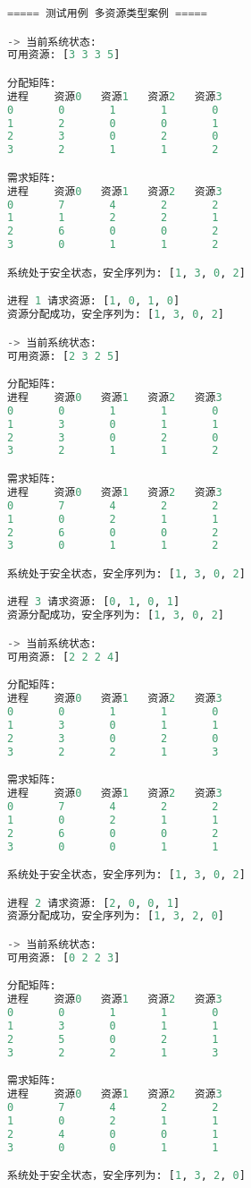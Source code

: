 \documentclass[12pt, a4paper, oneside]{ctexart}
\begin{document}
\begin{lstlisting}[language=Python, caption=测试用例三运行结果]
===== 测试用例 多资源类型案例 =====

-> 当前系统状态:
可用资源: [3 3 3 5]

分配矩阵:
进程    资源0   资源1   资源2   资源3
0       0       1       1       0
1       2       0       0       1
2       3       0       2       0
3       2       1       1       2

需求矩阵:
进程    资源0   资源1   资源2   资源3
0       7       4       2       2
1       1       2       2       1
2       6       0       0       2
3       0       1       1       2

系统处于安全状态，安全序列为: [1, 3, 0, 2]

进程 1 请求资源: [1, 0, 1, 0]
资源分配成功，安全序列为: [1, 3, 0, 2]

-> 当前系统状态:
可用资源: [2 3 2 5]

分配矩阵:
进程    资源0   资源1   资源2   资源3
0       0       1       1       0
1       3       0       1       1
2       3       0       2       0
3       2       1       1       2

需求矩阵:
进程    资源0   资源1   资源2   资源3
0       7       4       2       2
1       0       2       1       1
2       6       0       0       2
3       0       1       1       2

系统处于安全状态，安全序列为: [1, 3, 0, 2]

进程 3 请求资源: [0, 1, 0, 1]
资源分配成功，安全序列为: [1, 3, 0, 2]

-> 当前系统状态:
可用资源: [2 2 2 4]

分配矩阵:
进程    资源0   资源1   资源2   资源3
0       0       1       1       0
1       3       0       1       1
2       3       0       2       0
3       2       2       1       3

需求矩阵:
进程    资源0   资源1   资源2   资源3
0       7       4       2       2
1       0       2       1       1
2       6       0       0       2
3       0       0       1       1

系统处于安全状态，安全序列为: [1, 3, 0, 2]

进程 2 请求资源: [2, 0, 0, 1]
资源分配成功，安全序列为: [1, 3, 2, 0]

-> 当前系统状态:
可用资源: [0 2 2 3]

分配矩阵:
进程    资源0   资源1   资源2   资源3
0       0       1       1       0
1       3       0       1       1
2       5       0       2       1
3       2       2       1       3

需求矩阵:
进程    资源0   资源1   资源2   资源3
0       7       4       2       2
1       0       2       1       1
2       4       0       0       1
3       0       0       1       1

系统处于安全状态，安全序列为: [1, 3, 2, 0]
\end{lstlisting}
\end{document}

